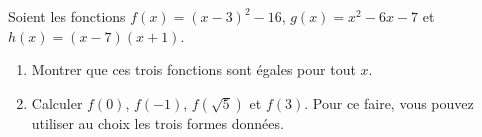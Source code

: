 
\begin{exercice}\label{exosmath-0044}

    Soient les fonctions \( f(x)=(x-3)^2-16\), \( g(x)=x^2-6x-7\) et \( h(x)=(x-7)(x+1)\).
    \begin{enumerate}
        \item
            Montrer que ces trois fonctions sont égales pour tout \( x\).
        \item
            Calculer \( f(0)\), \( f(-1)\), \( f(\sqrt{5})\) et \( f(3)\). Pour ce faire, vous pouvez utiliser au choix les trois formes données.
    \end{enumerate}

\end{exercice}
